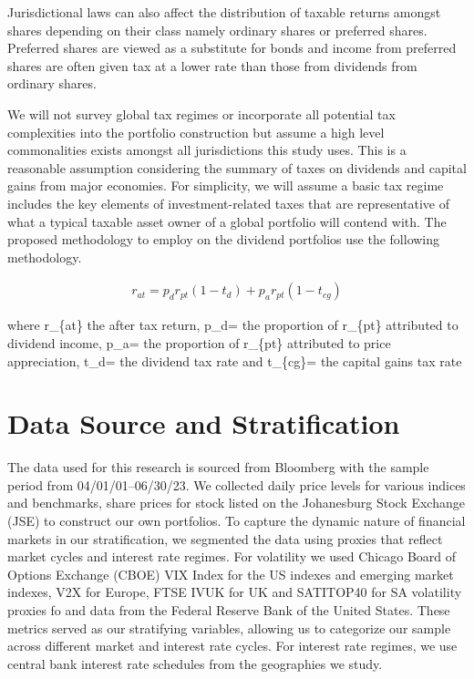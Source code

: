\documentclass[11pt,preprint, authoryear]{elsarticle}
\numberwithin{equation}{section}
\numberwithin{figure}{section}
\numberwithin{table}{section}
\begin{document}
Jurisdictional laws can also affect the distribution of taxable returns
amongst shares depending on their class namely ordinary shares or
preferred shares. Preferred shares are viewed as a substitute for bonds
and income from preferred shares are often given tax at a lower rate
than those from dividends from ordinary shares.

We will not survey global tax regimes or incorporate all potential tax
complexities into the portfolio construction but assume a high level
commonalities exists amongst all jurisdictions this study uses. This is
a reasonable assumption considering the summary of taxes on dividends
and capital gains from major economies. For simplicity, we will assume a
basic tax regime includes the key elements of investment-related taxes
that are representative of what a typical taxable asset owner of a
global portfolio will contend with. The proposed methodology to employ
on the dividend portfolios use the following methodology.

\begin{align}
r_{a t}=p_d r_{p t}\left(1-t_d\right)+p_a r_{p t}\left(1-t_{c g}\right)
\end{align}

where r\_\{at\} the after tax return, p\_d= the proportion of r\_\{pt\}
attributed to dividend income, p\_a= the proportion of r\_\{pt\}
attributed to price appreciation, t\_d= the dividend tax rate and
t\_\{cg\}= the capital gains tax rate

\newpage

\hypertarget{data-source-and-stratification}{%
\section{Data Source and
Stratification}\label{data-source-and-stratification}}

The data used for this research is sourced from Bloomberg with the
sample period from 04/01/01--06/30/23. We collected daily price levels
for various indices and benchmarks, share prices for stock listed on the
Johanesburg Stock Exchange (JSE) to construct our own portfolios. To
capture the dynamic nature of financial markets in our stratification,
we segmented the data using proxies that reflect market cycles and
interest rate regimes. For volatility we used Chicago Board of Options
Exchange (CBOE) VIX Index for the US indexes and emerging market
indexes, V2X for Europe, FTSE IVUK for UK and SATITOP40 for SA
volatility proxies fo and data from the Federal Reserve Bank of the
United States. These metrics served as our stratifying variables,
allowing us to categorize our sample across different market and
interest rate cycles. For interest rate regimes, we use central bank
interest rate schedules from the geographies we study.
\end{document}
